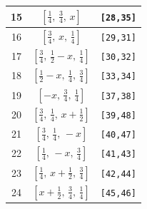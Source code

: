 \documentclass[fleqn,8pt]{jsarticle}
\begin{document}
\begin{longtable}{ccc}
15 & $\left[ \frac{1}{4},\, \frac{3}{4},\, x \right]$ & {\tt [28,35]} \\ \hline
16 & $\left[ \frac{3}{4},\, x,\, \frac{1}{4} \right]$ & {\tt [29,31]} \\ \hline
17 & $\left[ \frac{3}{4},\, \frac{1}{2} - x,\, \frac{1}{4} \right]$ & {\tt [30,32]} \\ \hline
18 & $\left[ \frac{1}{2} - x,\, \frac{1}{4},\, \frac{3}{4} \right]$ & {\tt [33,34]} \\ \hline
19 & $\left[ - x,\, \frac{3}{4},\, \frac{1}{4} \right]$ & {\tt [37,38]} \\ \hline
20 & $\left[ \frac{3}{4},\, \frac{1}{4},\, x + \frac{1}{2} \right]$ & {\tt [39,48]} \\ \hline
21 & $\left[ \frac{3}{4},\, \frac{1}{4},\, - x \right]$ & {\tt [40,47]} \\ \hline
22 & $\left[ \frac{1}{4},\, - x,\, \frac{3}{4} \right]$ & {\tt [41,43]} \\ \hline
23 & $\left[ \frac{1}{4},\, x + \frac{1}{2},\, \frac{3}{4} \right]$ & {\tt [42,44]} \\ \hline
24 & $\left[ x + \frac{1}{2},\, \frac{3}{4},\, \frac{1}{4} \right]$ & {\tt [45,46]} \\
\end{longtable}
\renewcommand{\arraystretch}{1.2}
\end{document}
